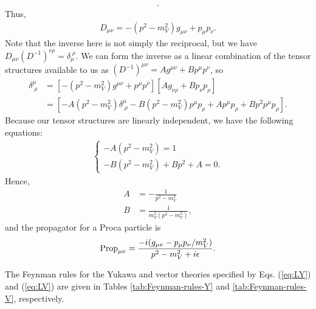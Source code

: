 {\begin{align}
.\end{align}
Thus,
\begin{align}
    D_{\mu\nu} = - ( p^2 - m_{V}^2 ) g_{\mu\nu} + p_{\mu} p_{\nu}
.\end{align}
Note that the inverse here is not simply the reciprocal, but we have $D_{\mu\nu} (D^{-1})^{\nu\rho} = \delta_{\mu}^{\;\rho}$.
We can form the inverse as a linear combination of the tensor structures available to us as $(D^{-1})^{\mu\nu} = A g^{\mu\nu} + B p^{\mu} p^{\nu}$, so
\begin{align}
    \delta^{\mu}_{\;\rho} &= [ -(p^2 - m_{V}^2) g^{\mu\nu} + p^{\mu} p^{\nu} ] [ A g_{\nu\rho} + B p_{\nu} p_{\rho} ] \nonumber \\
                          &= [ -A (p^2 - m_{V}^2) \delta^{\mu}_{\;\rho} - B (p^2 - m_{V}^2) p^{\mu} p_{\rho} + A p^{\mu} p_{\rho} + B p^2 p^{\mu} p_{\rho} ]
.\end{align}
Because our tensor structures are linearly independent, we have the following equations:
\begin{align}
\begin{cases} 
    -A (p^2 - m_{V}^2) = 1 \\
    -B (p^2 - m_{V}^2) + B p^2 + A = 0
.\end{cases}
\end{align}
Hence,
\begin{align}
\label{eq:A-B-proca-prop}
    A &= -\frac{1}{p^2 - m_{V}^2} \\
    B &= \frac{1}{m_{V}^2( p^2 - m_{V}^2 )}
,\end{align}
and the propagator for a Proca particle is
\begin{align}
    {\rm Prop}_{\mu\nu} = \frac{-i ( g_{\mu\nu} - p_{\mu} p_{\nu} / m_{V}^2 )}{p^2 - m_{V}^2 + i \epsilon}
.\end{align}

The Feynman rules for the Yukawa and vector theories specified by Eqs. (\ref{eq:LY}) and (\ref{eq:LV}) are given in Tables \ref{tab:Feynman-rules-Y} and \ref{tab:Feynman-rules-V}, respectively.

}
